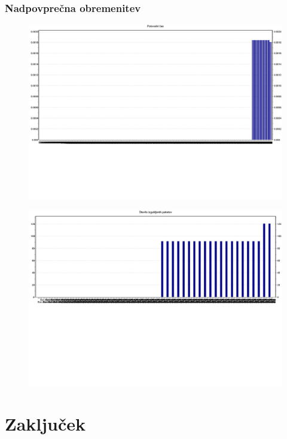 \documentclass[11pt,a4paper,slovene]{myarticle}
\begin{document}
\subsubsection{Nadpovprečna obremenitev}
\begin{figure}[H]
\includegraphics[scale=0.40]{slike/bus/NADpotovalniCas.png}
\end{figure}
\begin{figure}[H]
\includegraphics[scale=0.40]{slike/bus/NADstIzgubljenihPaketov.png}
\end{figure}

\section{Zaključek}

\pagebreak


\end{document}
